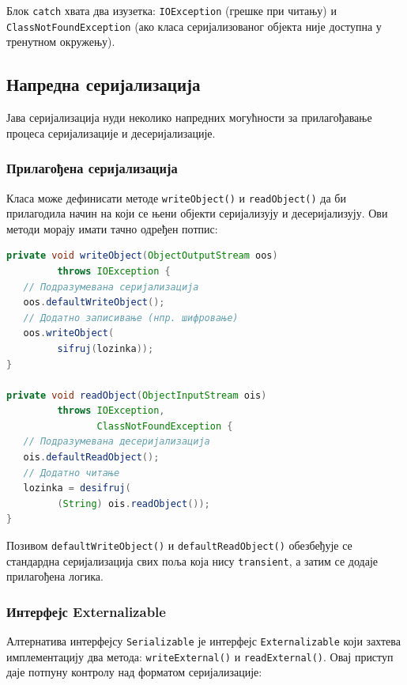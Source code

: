 Блок \texttt{catch} хвата два изузетка: \texttt{IOException} (грешке при читању) и \texttt{ClassNotFoundException} (ако класа серијализованог објекта није доступна у тренутном окружењу).


\subsection{Напредна серијализација}

Јава серијализација нуди неколико напредних могућности за прилагођавање процеса серијализације и десеријализације.


\subsubsection{Прилагођена серијализација}

Класа може дефинисати методе \texttt{writeObject()} и \texttt{readObject()} да би прилагодила начин на који се њени објекти серијализују и десеријализују. Ови методи морају имати тачно одређен потпис:


\begin{lstlisting}[language=Java]
private void writeObject(ObjectOutputStream oos)
         throws IOException {
   // Подразумевана серијализација
   oos.defaultWriteObject();
   // Додатно записивање (нпр. шифровање)
   oos.writeObject(
         sifruj(lozinka));
}
 
private void readObject(ObjectInputStream ois)
         throws IOException,
                ClassNotFoundException {
   // Подразумевана десеријализација
   ois.defaultReadObject();
   // Додатно читање
   lozinka = desifruj(
         (String) ois.readObject());
}
\end{lstlisting}


Позивом \texttt{defaultWriteObject()} и \texttt{defaultReadObject()} обезбеђује се стандардна серијализација свих поља која нису \texttt{transient}, а затим се додаје прилагођена логика.


\subsubsection{Интерфејс Externalizable}

Алтернатива интерфејсу \texttt{Serializable} је интерфејс \texttt{Externalizable} који захтева имплементацију два метода: \texttt{writeExternal()} и \texttt{readExternal()}. Овај приступ даје потпуну контролу над форматом серијализације:



